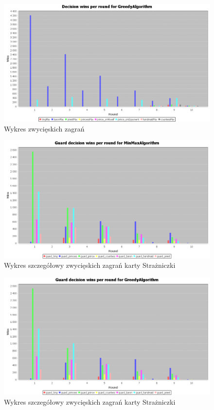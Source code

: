\begin{figure}[H]
	\centering
	\includegraphics[width=\textwidth]{Resources/MirrorMmVsG/GVsMmDecision.PNG}
	\caption{Wykres zwycięskich zagrań} 
	\label{fig:MirrorGVsMmDecision}
\end{figure} 

\begin{figure}[H]
	\centering
	\includegraphics[width=\textwidth]{Resources/MirrorMmVsG/MmVsGGuardDecision.PNG}
	\caption{Wykres szczegółowy zwycięskich zagrań karty Strażniczki} 
	\label{fig:MmVsGGuardDecisionn}
\end{figure}

\begin{figure}[H]
	\centering
	\includegraphics[width=\textwidth]{Resources/MirrorMmVsG/GVsMmGuardDecision.PNG}
	\caption{Wykres szczegółowy zwycięskich zagrań karty Strażniczki} 
	\label{fig:GVsMmGuardDecision}
\end{figure}



